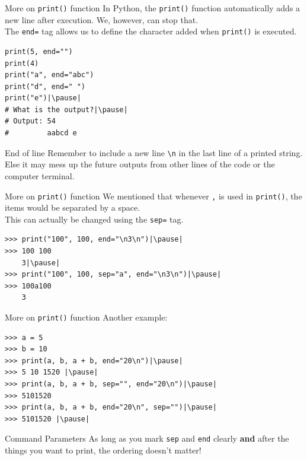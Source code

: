 \documentclass[dvipsnames, svgnames, x11names, handout]{beamer}
\begin{document}
\begin{frame}[fragile]{More on \texttt{print()} function}
In Python, the \texttt{print()} function automatically adds a new line after execution. We, however, can stop that.\\
The \texttt{end=} tag allows us to define the character added when \texttt{print()} is executed.
\begin{verbatim}
print(5, end="")
print(4)
print("a", end="abc")
print("d", end=" ")
print("e")|\pause|
# What is the output?|\pause|
# Output: 54
#         aabcd e
\end{verbatim}
\begin{block}{End of line}
Remember to include a new line {\color{BrickRed}\texttt{\textbackslash n}} in the last line of a printed string.\\
Else it may mess up the future outputs from other lines of the code or the computer terminal.
\end{block}
\end{frame}

\begin{frame}[fragile]{More on \texttt{print()} function}
We mentioned that whenever \texttt{,} is used in \texttt{print()}, the items would be separated by a space.\\
This can actually be changed using the \texttt{sep=} tag.\pause
\begin{verbatim}
>>> print("100", 100, end="\n3\n")|\pause|
>>> 100 100
	3|\pause|
>>> print("100", 100, sep="a", end="\n3\n")|\pause|
>>> 100a100
	3
\end{verbatim}

\end{frame}

\begin{frame}[fragile]{More on \texttt{print()} function}
Another example:
\begin{verbatim}
>>> a = 5
>>> b = 10
>>> print(a, b, a + b, end="20\n")|\pause|
>>> 5 10 1520 |\pause|
>>> print(a, b, a + b, sep="", end="20\n")|\pause|
>>> 5101520	
>>> print(a, b, a + b, end="20\n", sep="")|\pause|
>>> 5101520	|\pause|
\end{verbatim}
\begin{block}{Command Parameters}
As long as you mark \texttt{sep} and \texttt{end} clearly \textbf{and} after the things you want to print, the ordering doesn't matter!
\end{block}
\end{frame}
\end{document}
